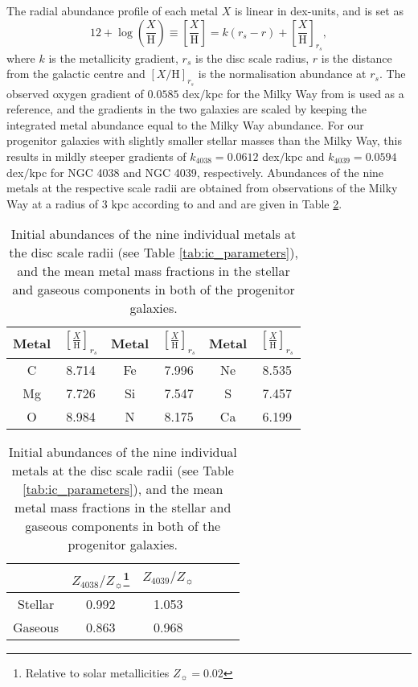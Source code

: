 \documentclass[a4paper,fleqn,usenatbib]{mnras}
\begin{document}
The radial abundance profile of each metal $X$ is linear in dex-units, and is set as
\begin{equation}
 12+\log\left(\frac{X}{\mathrm{H}}\right) \equiv 
\left[\frac{X}{\mathrm{H}}\right]=k(r_s-r)+\left[\frac{X}{\mathrm{H}}\right]_{
r_s},
\end{equation}
where $k$ is the metallicity gradient, $r_s$ is the disc scale radius, 
$r$ is the distance from the galactic centre and 
$[X/\mathrm{H}]_{r_s}$ is the normalisation abundance at 
$r_s$. The observed oxygen gradient of $0.0585$ dex$/$kpc for the Milky Way from 
\citet{1994ApJ...420...87Z} is used as a reference, and the gradients in the two 
galaxies are scaled by keeping the integrated metal abundance equal to the Milky Way 
abundance. For our progenitor galaxies with slightly smaller stellar masses than the Milky Way,
this results in mildly steeper gradients of $k_\mathrm{4038}=0.0612$ dex$/$kpc and 
$k_\mathrm{4039}=0.0594$ dex$/$kpc for NGC 4038 and NGC 4039, respectively. Abundances of 
the nine metals at the respective scale radii are obtained from observations of 
the Milky Way at a radius of $3$ kpc according to \citet{1994A&A...291..757K} and 
\citet{1993PASP..105..327A} and are given in Table \ref{tab:ic_metals}.


\begin{table}
 \caption{Initial abundances of the nine individual metals at the disc scale 
radii (see Table \ref{tab:ic_parameters}), 
and the mean metal mass fractions in the stellar and gaseous components in
both of the progenitor galaxies.}
 \label{tab:ic_metals}
 \begin{minipage}{6cm}
 \begin{tabular}{cccccc}
  \hline
  Metal & $\left[\frac{X}{\mathrm{H}}\right]_{r_s}$ & Metal & 
$\left[\frac{X}{\mathrm{H}}\right]_{r_s}$ & Metal & 
$\left[\frac{X}{\mathrm{H}}\right]_{r_s}$ \\
  \hline
  C & 8.714 & Fe & 7.996 & Ne & 8.535 \\[2pt]
  Mg & 7.726 & Si & 7.547 & S & 7.457 \\[2pt]
  O & 8.984 & N & 8.175 & Ca & 6.199 \\[2pt]
  \hline
 \end{tabular}
 \begin{tabular}{cccccc}
  & $Z_{4038}/Z_{\sun}$\footnote{Relative to solar metallicities $Z_{\sun}=0.02$} & $Z_{4039}/Z_{\sun}$ & &\\[2pt]
  \hline
   Stellar & 0.992  & 1.053 & &\\[2pt]
   Gaseous & 0.863 & 0.968 & &\\[2pt]
  \hline
  \end{tabular}

 \end{minipage}
\end{table}
\end{document}
